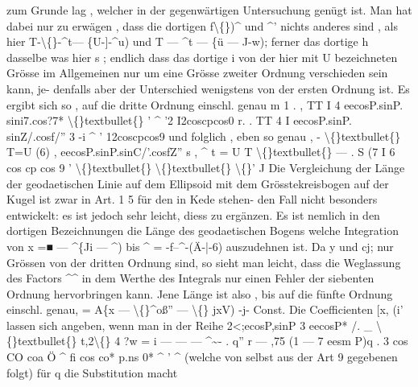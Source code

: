\documentclass[12pt,a4paper]{article}
\begin{document}
zum  Grunde  lag ,  welcher  in  der  gegenwärtigen  Untersuchung  genügt  ist.  Man hat  dabei  nur  zu  erwägen ,  dass  die  dortigen  f\textbackslash\{\})\^{}  und  \^{}'  nichts  anderes  sind ,  als hier  T-\textbackslash\{\}-\^{}t--- \{U-]-\^{}u)  und  T --- \^{}t --- \{ü --- J-w);  ferner  das  dortige  h  dasselbe was  hier  s ;  endlich  dass  das  dortige  i  von  der  hier  mit  U  bezeichneten  Grösse im  Allgemeinen  nur  um  eine  Grösse  zweiter  Ordnung  verschieden  sein  kann,  je- denfalls aber  der  Unterschied  wenigstens  von  der  ersten  Ordnung  ist.  Es  ergibt sich  so ,  auf  die  dritte  Ordnung  einschl.  genau m    1     .   ,  TT  I     4             eecosP.sinP.  sini7.cos?7*       \textbackslash\{\}textbullet\{\} '     \^{}  '2                           I2coscpcos0 r.   .  TT        4  I    eecosP.sinP.  sinZ/.cosf/''      3 -i  \^{}  '                  12coscpcos9 und  folglich ,  eben  so  genau , -  \textbackslash\{\}textbullet\{\}  T=U (6) ,  eecosP.sinP.sinC/'.cosfZ''      s  ,    \^{} t    =  U   T  \textbackslash\{\}textbullet\{\} ---  .  S    (7  I 6 cos cp  cos 9  '     \textbackslash\{\}textbullet\{\}     \textbackslash\{\}textbullet\{\}       \textbackslash\{\}'  J Die  Vergleichung  der  Länge  der  geodaetischen  Linie  auf  dem  Ellipsoid  mit dem  Grösstekreisbogen  auf  der  Kugel  ist  zwar  in  Art.  1 5  für  den  in  Kede  stehen- den Fall  nicht  besonders  entwickelt:  es  ist  jedoch  sehr  leicht,  diess  zu  ergänzen. Es  ist  nemlich  in  den  dortigen  Bezeichnungen  die  Länge  des  geodaetischen  Bogens welche  Integration  von  x  =■  --- \^{}\{Ji  ---  \^{})  bis  \^{}  =  -f--\^{}-(Ä-|-6)  auszudehnen  ist. Da  y  und  cj;  nur  Grössen  von  der  dritten  Ordnung  sind,  so  sieht  man  leicht,  dass die  Weglassung  des  Factors  \^{}\^{}  in  dem  Werthe  des  Integrals  nur  einen  Fehler der  siebenten  Ordnung  hervorbringen  kann.  Jene  Länge  ist  also ,  bis  auf  die fünfte  Ordnung  einschl.  genau, =  A\{x  ---  \textbackslash\{\}\^{}oß''  ---  \textbackslash\{\} jxV) -j-  Const. Die  Coefficienten    [x,  (i'   lassen  sich  angeben,  wenn  man  in  der  Reihe 2<;ecosP,sinP       3  eecosP*      /.         \_  \textbackslash\{\}textbullet\{\}      t,2\textbackslash\{\}     4 ?w  =  i   --- --- --- \^{}\textasciitilde{}-  .  q'' r --- ,75  (1  ---  7  eesm P)q     . 3  cos  CO  coa  Ö  \^{}  fi  cos  co*  p.ns  0*  \^{}  '  \^{} (welche  von  selbst  aus  der  Art  9  gegebenen  folgt)  für  q  die  Substitution  macht
\end{document}
